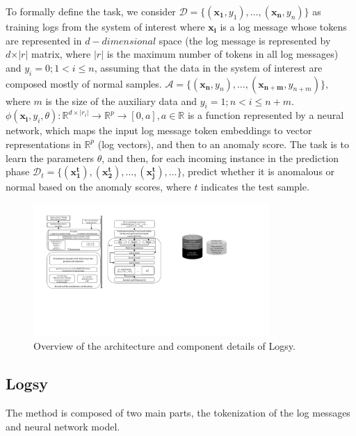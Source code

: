 To formally define the task, we consider $\mathcal{D}=\{(\mathbf{x_1}, y_1), \dots, (\mathbf{x_n}, y_n)\}$ as training logs from the system of interest where $\mathbf{x_i}$ is a log message whose tokens are represented in $d-dimensional$ space (the log message is represented by $d\times \vert r \vert$ matrix, where $\vert r \vert$ is the maximum number of tokens in all log messages) and $y_i=0; 1 < i \leq n$, assuming that the data in the system of interest are composed mostly of normal samples. $\mathcal{A}=\{(\mathbf{x_n}, y_{n}),\dots, (\mathbf{x_{n+m}}, y_{n+m})\}$, where $m$ is the size of the auxiliary data and $y_i={1}; n < i \leq n+m$. $\phi(\mathbf{x_i}, y_i, \theta): \mathbb{R}^{d \times |r_i|} \rightarrow \mathbb{R}^p \rightarrow [0, a], a \in \mathbb{R}$ is a function represented by a neural network, which maps the input log message token embeddings to vector representations in $\mathbb{R}^p$ (log vectors), and then to an anomaly score. The task is to learn the parameters $\theta$, and then, for each incoming instance in the prediction phase $\mathcal{D}_t=\{(\mathbf{x_1^t}), (\mathbf{x_2^t}),\dots, (\mathbf{x_j^t}), \dots\}$, predict whether it is anomalous or normal based on the anomaly scores, where $t$ indicates the test sample.

\begin{figure}[!b]
\centering
\includegraphics[width=0.8\textwidth]{gfx/chap4/model_loganomalydetection.pdf}
\caption{Overview of the architecture and component details of Logsy.}
\label{overviewmethod}
\end{figure}

\subsection{Logsy}
The method is composed of two main parts, the tokenization of the log messages and neural network model.

